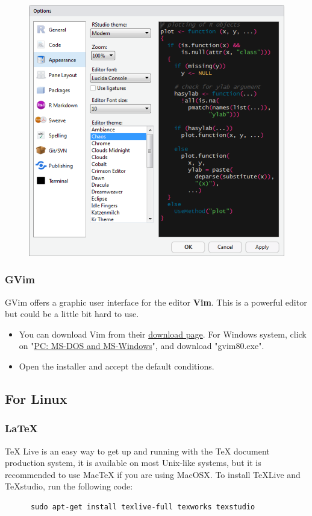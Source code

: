 \documentclass[10pt]{article} %
\begin{document}
\begin{itemize}
        \begin{figure}[h!]
          \centering
          \includegraphics[width=0.6\linewidth]{figs/chaos}
          \caption{}
          \label{fig:chaos}
        \end{figure}
      \end{itemize}


    \subsubsection{GVim}

      GVim offers a graphic user interface for the editor \textbf{Vim}.
      This is a powerful editor but could be a little bit hard to use.
      \begin{itemize}
        \item You can download Vim from their \href{https://vim.sourceforge.io/download.php}{download page}.
        For Windows system, click on "\href{https://vim.sourceforge.io/download.php#pc}{PC: MS-DOS and MS-Windows}", and download "gvim80.exe".
        \item Open the installer and accept the default conditions.
      \end{itemize}

  \subsection{For Linux}

    \subsubsection{LaTeX}

      TeX Live is an easy way to get up and running with the TeX document production system, it is available on most Unix-like systems, but it is recommended to use MacTeX if you are using MacOSX.
      To install TeXLive and TeXstudio, run the following code:
      \begin{lstlisting}
      sudo apt-get install texlive-full texworks texstudio
      \end{lstlisting}
\end{document}
